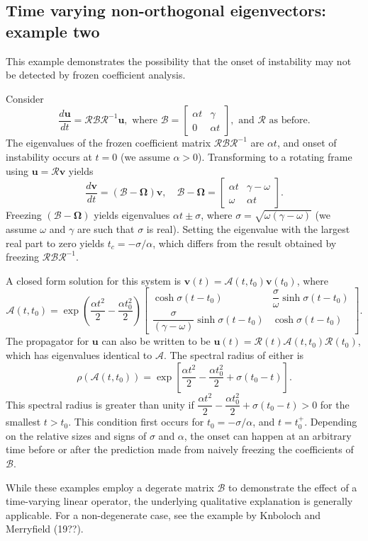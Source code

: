 \documentclass[letterpaper,10pt]{article}
\newcommand{\bu}{\boldsymbol{u}}
\newcommand{\bv}{\boldsymbol{v}}
\newcommand{\cA}{\boldsymbol{\mathcal{A}}}
\newcommand{\cB}{\boldsymbol{\mathcal{B}}}
\newcommand{\cR}{\boldsymbol{\mathcal{R}}}
\newcommand{\cOmega}{\boldsymbol{\boldsymbol{\Omega}}}
\newcommand{\Btmat}{{
\begin{bmatrix} 
 \alpha t & \gamma \\
 0  & \alpha t
\end{bmatrix}
}}
\begin{document}
\subsection*{Time varying non-orthogonal eigenvectors: example two}
This example demonstrates the possibility that the onset of instability may not be detected by frozen coefficient analysis.

Consider 
\begin{equation}
 \frac{d\bu}{dt} = \cR \cB \cR^{-1} \bu, \text{ where } \cB = \Btmat, \text{ and } \cR \text { as before.}
\end{equation}
The eigenvalues of the frozen coefficient matrix $\cR \cB \cR^{-1}$ are $\alpha t$, and onset of instability occurs at $t=0$ (we assume $\alpha>0$). Transforming to a rotating frame using $\bu = \cR \bv$ yields
\begin{equation}
 \frac{d\bv}{dt} = (\cB - \cOmega) \bv, \quad \cB - \cOmega = \begin{bmatrix} \alpha t & \gamma-\omega \\ \omega & \alpha t \end{bmatrix}.
\end{equation}
Freezing $(\cB - \cOmega)$ yields eigenvalues $\alpha t \pm \sigma$, where $\sigma = \sqrt{\omega (\gamma-\omega)}$ (we assume $\omega$ and $\gamma$ are such that $\sigma$ is real). Setting the eigenvalue with the largest real part to zero yields $t_c = -\sigma/\alpha$, which differs from the result obtained by freezing $\cR \cB \cR^{-1}$. 

A closed form solution for this system is $\bv(t) = \cA(t,t_0) \bv(t_0)$, where
\begin{equation}
 \cA(t,t_0) = \exp \left(\dfrac{\alpha t^2}{2} - \dfrac{\alpha t_0^2}{2} \right)
 \begin{bmatrix}
                                 \cosh \sigma (t-t_0) & \dfrac{\sigma}{\omega} \sinh \sigma(t-t_0) \\
 \dfrac{\sigma}{(\gamma-\omega)} \sinh \sigma (t-t_0) &                         \cosh\sigma (t-t_0)
 \end{bmatrix}
.
\end{equation}
The propagator for $\bu$ can also be written to be $\bu(t) = \cR(t) \cA(t, t_0) \cR(t_0)$, which has eigenvalues identical to $\cA$. The spectral radius of either is
\begin{equation}
 \rho(\cA (t, t_0)) = \exp \left[ \dfrac{\alpha t^2}{2} - \dfrac{\alpha t_0^2}{2} + \sigma (t_0-t) \right]. 
\end{equation}
This spectral radius is greater than unity if $\dfrac{\alpha t^2}{2} - \dfrac{\alpha t_0^2}{2} + \sigma (t_0-t)>0$ for the smallest $t>t_0$. This condition first occurs for $t_0 = -\sigma/\alpha$, and $t=t_0^{+}$. Depending on the relative sizes and signs of $\sigma$ and $\alpha$, the onset can happen at an arbitrary time before or after the prediction made from naively freezing the coefficients of $\cB$.

While these examples employ a degerate matrix $\cB$ to demonstrate the effect of a time-varying linear operator, the underlying qualitative explanation is generally applicable. For a non-degenerate case, see the example by Knboloch and Merryfield (19??).
\end{document}
